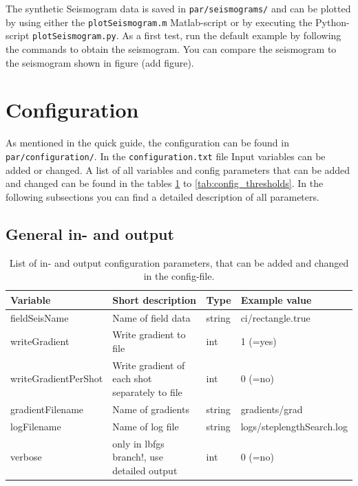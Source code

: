 \documentclass[pdftex,a4paper,parskip,listof=totoc,bibliography=totoc,onehalfspacing,12pt]{scrreprt}
\newcommand{\shellcmd}[1]{\indent\indent\texttt{#1}}	%
\begin{document}
The synthetic Seismogram data is saved in \shellcmd{par/seismograms/} and can be plotted by using either the \shellcmd{plotSeismogram.m} Matlab-script or by executing the Python-script \shellcmd{plotSeismogram.py}.
As a first test, run the default example by following the commands to obtain the seismogram. You can compare the seismogram to the seismogram shown in figure (add figure).


\section{Configuration}\label{sec:config}

As mentioned in the quick guide, the configuration can be found in \shellcmd{par/configuration/}. In the \shellcmd{configuration.txt} file Input variables can be added or changed. A list of all variables and config parameters that can be added and changed can be found in the tables \ref{tab:config_IO} to \ref{tab:config_thresholds}. In the following subsections you can find a detailed description of all parameters.

\subsection{General in- and output}

\begin{table}[h!]
\caption[List of in- and output configuration parameters.]{List of in- and output configuration parameters, that can be added and changed in the config-file.}\label{tab:config_IO}
\centering
\begin{adjustbox}{width=1\textwidth,center=\textwidth}
	\begin{tabular}{llll}
	\toprule
         Variable                 & Short description                                                   & Type   & Example value \\
	\midrule
         fieldSeisName            & Name of field data                                                  & string & ci/rectangle.true  \\    
         writeGradient            & Write gradient to file                                              &  int   & 1 (=yes) \\
         writeGradientPerShot     & Write gradient of each shot separately to file                      &  int   & 0 (=no) \\
         gradientFilename         & Name of gradients                                                   & string & gradients/grad \\     
         logFilename              & Name of log file                                                    & string & logs/steplengthSearch.log  \\
         verbose                  & only in lbfgs branch!, use detailed output                          &  int   & 0 (=no) \\
	\bottomrule
	\end{tabular}
	\end{adjustbox}
\end{table}
\end{document}
